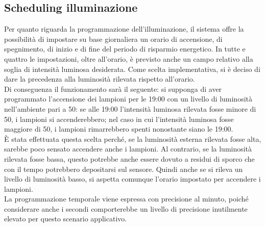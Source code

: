 \subsection{Scheduling illuminazione \label{si}}
Per quanto riguarda la programmazione dell'illuminazione, il sistema offre la possibilità di impostare su base giornaliera un orario di accensione, di spegnimento, di inizio e di fine del periodo di risparmio energetico.
In tutte e quattro le impostazioni, oltre all'orario, è previsto anche un campo relativo alla soglia di intensità luminosa desiderata.
Come scelta implementativa, si è deciso di dare la precedenza alla luminosità rilevata rispetto all'orario.
\\Di conseguenza il funzionamento sarà il seguente: si supponga di aver programmato l'accensione dei lampioni per le 19:00 con un livello di luminosità nell'ambiente pari a 50:
se alle 19:00 l'intensità luminosa rilevata fosse minore di 50, i lampioni si accenderebbero; nel caso in cui l'intensità luminosa fosse maggiore di 50, i lampioni rimarrebbero spenti nonostante siano le 19:00.
\\È stata effettuata questa scelta perché, se la luminosità esterna rilevata fosse alta, sarebbe poco sensato accendere anche i lampioni.
Al contrario, se la luminosità rilevata fosse bassa, questo potrebbe anche essere dovuto a residui di sporco che con il tempo potrebbero depositarsi sul sensore.
Quindi anche se si rileva un livello di luminosità basso, si aspetta comunque l'orario impostato per accendere i lampioni.
\\La programmazione temporale viene espressa con precisione al minuto, poiché considerare anche i secondi comporterebbe un livello di precisione inutilmente elevato per questo scenario applicativo.

